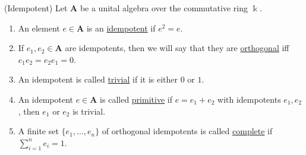 \begin{definition}{(Idempotent)}\label{def:idempotent}
Let $\mathbf{A}$ be a unital algebra over the commutative ring $\Bbbk$.
\begin{enumerate}
\renewcommand{\labelenumi}{(\theenumi)}
\item An element $e\in \mathbf{A}$ is an \ul{idempotent} if $e^{2} = e$.
\item If $e_{1}, e_{2} \in \mathbf{A}$ are idempotents, then we will say that they are \ul{orthogonal} iff $e_{1}e_{2} = e_{2}e_{1} = 0$.
\item An idempotent is called \ul{trivial} if it is either $0$ or $1$.
\item An idempotent $e \in \mathbf{A}$ is called \ul{primitive} if $e = e_{1} + e_{2}$ with idempotents $e_{1}, e_{2}$, then
$e_{1}$ or $e_{2}$ is trivial.
\item A finite set $\{e_{1},\dots,e_{n}\}$ of orthogonal idempotents is called \ul{complete} if $\sum_{i=1}^{n} e_{i} = 1$.
\end{enumerate}
\end{definition}

